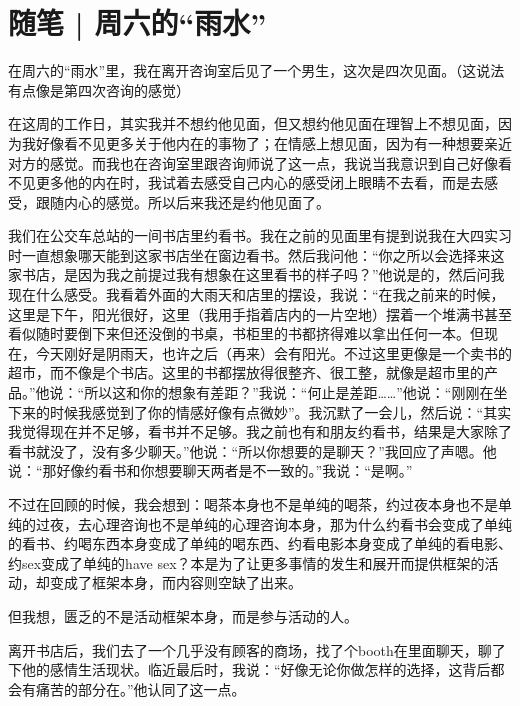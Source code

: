 \chapter{随笔 | 周六的“雨水”}


在周六的“雨水”里，我在离开咨询室后见了一个男生，这次是四次见面。（这说法有点像是第四次咨询的感觉）

在这周的工作日，其实我并不想约他见面，但又想约他见面\pozhehao{}在理智上不想见面，因为我好像看不见更多关于他内在的事物了；在情感上想见面，因为有一种想要亲近对方的感觉。而我也在咨询室里跟咨询师说了这一点，我说当我意识到自己好像看不见更多他的内在时，我试着去感受自己内心的感受\pozhehao{}闭上眼睛不去看，而是去感受，跟随内心的感觉。所以后来我还是约他见面了。

\tristarsepline

我们在公交车总站的一间书店里约看书。我在之前的见面里有提到说我在大四实习时一直想象哪天能到这家书店坐在窗边看书。然后我问他：“你之所以会选择来这家书店，是因为我之前提过我有想象在这里看书的样子吗？”他说是的，然后问我现在什么感受。我看着外面的大雨天和店里的摆设，我说：“在我之前来的时候，这里是下午，阳光很好，这里（我用手指着店内的一片空地）摆着一个堆满书甚至看似随时要倒下来但还没倒的书桌，书柜里的书都挤得难以拿出任何一本。但现在，今天刚好是阴雨天，也许之后（再来）会有阳光。不过这里更像是一个卖书的超市，而不像是个书店。这里的书都摆放得很整齐、很工整，就像是超市里的产品。”他说：“所以这和你的想象有差距？”我说：“何止是差距……”他说：“刚刚在坐下来的时候我感觉到了你的情感好像有点微妙”。我沉默了一会儿，然后说：“其实我觉得现在并不足够，看书并不足够。我之前也有和朋友约看书，结果是大家除了看书就没了，没有多少聊天。”他说：“所以你想要的是聊天？”我回应了声嗯。他说：“那好像约看书和你想要聊天两者是不一致的。”我说：“是啊。”

不过在回顾的时候，我会想到：喝茶本身也不是单纯的喝茶，约过夜本身也不是单纯的过夜，去心理咨询也不是单纯的心理咨询本身，那为什么约看书会变成了单纯的看书、约喝东西本身变成了单纯的喝东西、约看电影本身变成了单纯的看电影、约sex变成了单纯的have sex？本是为了让更多事情的发生和展开而提供框架的活动，却变成了框架本身，而内容则空缺了出来。

但我想，匮乏的不是活动框架本身，而是参与活动的人。

\tristarsepline

离开书店后，我们去了一个几乎没有顾客的商场，找了个booth在里面聊天，聊了下他的感情生活现状。临近最后时，我说：“好像无论你做怎样的选择，这背后都会有痛苦的部分在。”他认同了这一点。

